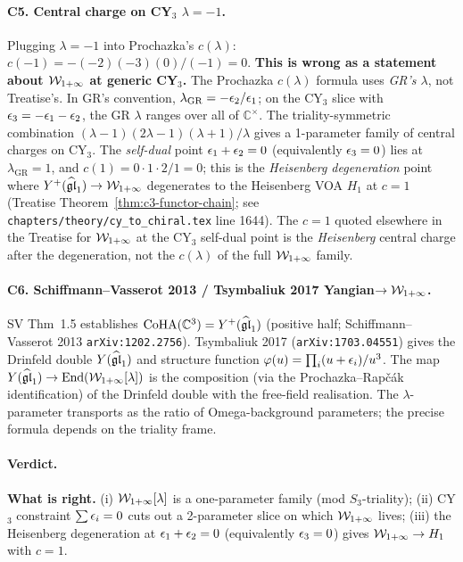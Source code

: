 \paragraph{C5. Central charge on CY$_3$ $\lambda = -1$.}
Plugging $\lambda = -1$ into Prochazka's $c(\lambda)$:
$c(-1) = -(-2)(-3)(0)/(-1) = 0$. \textbf{This is wrong as a statement about
$\mathcal{W}_{1+\infty}$ at generic CY$_3$.} The Prochazka $c(\lambda)$ formula
uses \emph{GR's $\lambda$}, not Treatise's. In GR's convention,
$\lambda_{\mathrm{GR}} = -\epsilon_2/\epsilon_1$; on the CY$_3$ slice with
$\epsilon_3 = -\epsilon_1-\epsilon_2$, the GR $\lambda$ ranges over all of
$\mathbb{C}^\times$. The triality-symmetric combination
$(\lambda-1)(2\lambda-1)(\lambda+1)/\lambda$ gives a 1-parameter family
of central charges on CY$_3$. The \emph{self-dual} point
$\epsilon_1 + \epsilon_2 = 0$ (equivalently $\epsilon_3 = 0$) lies at
$\lambda_{\mathrm{GR}} = 1$, and $c(1) = 0 \cdot 1 \cdot 2 / 1 = 0$;
this is the \emph{Heisenberg degeneration} point where
$Y^+(\widehat{\mathfrak{gl}}_1) \to \mathcal{W}_{1+\infty}$ degenerates to the Heisenberg VOA $H_1$ at
$c=1$ (Treatise Theorem~\ref{thm:c3-functor-chain}; see
\texttt{chapters/theory/cy\_to\_chiral.tex} line 1644). The $c=1$
quoted elsewhere in the Treatise for $\mathcal{W}_{1+\infty}$ at the CY$_3$ self-dual
point is the \emph{Heisenberg} central charge after the degeneration,
not the $c(\lambda)$ of the full $\mathcal{W}_{1+\infty}$ family.

\paragraph{C6. Schiffmann--Vasserot 2013 / Tsymbaliuk 2017 Yangian$\to\mathcal{W}_{1+\infty}$.}
SV Thm~1.5 establishes $\mathrm{CoHA}(\mathbb{C}^3) = Y^+(\widehat{\mathfrak{gl}}_1)$
(positive half; Schiffmann--Vasserot 2013 \texttt{arXiv:1202.2756}).
Tsymbaliuk 2017 (\texttt{arXiv:1703.04551}) gives the Drinfeld double
$Y(\widehat{\mathfrak{gl}}_1)$ and structure function $\varphi(u) = \prod_i
(u+\epsilon_i)/u^3$. The map $Y(\widehat{\mathfrak{gl}}_1) \to \mathrm{End}(\mathcal{W}_{1+\infty}[\lambda])$
is the composition (via the Prochazka--Rapčák identification) of the
Drinfeld double with the free-field realisation. The $\lambda$-parameter
transports as the ratio of Omega-background parameters; the precise
formula depends on the triality frame.

\paragraph{Verdict.}
\textbf{What is right.} (i) $\mathcal{W}_{1+\infty}[\lambda]$ is a one-parameter family
(mod $S_3$-triality); (ii) CY$_3$ constraint $\sum \epsilon_i = 0$ cuts
out a 2-parameter slice on which $\mathcal{W}_{1+\infty}$ lives; (iii) the Heisenberg
degeneration at $\epsilon_1 + \epsilon_2 = 0$ (equivalently $\epsilon_3 = 0$)
gives $\mathcal{W}_{1+\infty} \to H_1$ with $c=1$.

